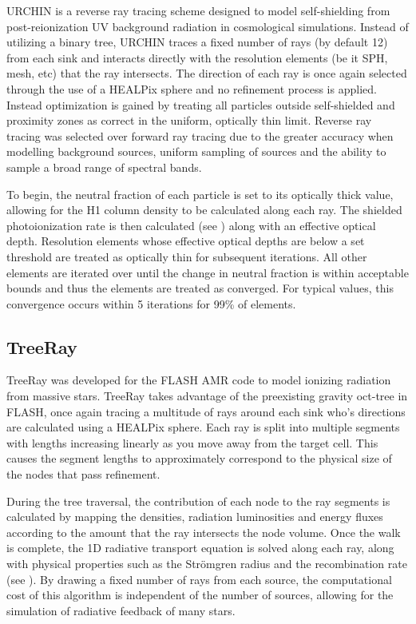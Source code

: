 URCHIN \citep{urchin} is a reverse ray tracing scheme designed to model self-shielding from post-reionization UV background radiation in cosmological simulations. Instead of utilizing a binary tree, URCHIN traces a fixed number of rays (by default 12) from each sink and interacts directly with the resolution elements (be it SPH, mesh, etc) that the ray intersects. The direction of each ray is once again selected through the use of a HEALPix sphere and no refinement process is applied. Instead optimization is gained by treating all particles outside self-shielded and proximity zones as correct in the uniform, optically thin limit. Reverse ray tracing was selected over forward ray tracing due to the greater accuracy when modelling background sources, uniform sampling of sources and the ability to sample a broad range of spectral bands.

To begin, the neutral fraction of each particle is set to its optically thick value, allowing for the H1 column density to be calculated along each ray. The shielded photoionization rate is then calculated (see \citealt{urchin}) along with an effective optical depth. Resolution elements whose effective optical depths are below a set threshold are treated as optically thin for subsequent iterations. All other elements are iterated over until the change in neutral fraction is within acceptable bounds and thus the elements are treated as converged. For typical values, this convergence occurs within 5 iterations for 99\% of elements.

\subsection{TreeRay}

TreeRay \citep{treeRay} was developed for the FLASH AMR code \citep{flash} to model ionizing radiation from massive stars. TreeRay takes advantage of the preexisting gravity oct-tree in FLASH, once again tracing a multitude of rays around each sink who's directions are calculated using a HEALPix sphere. Each ray is split into multiple segments with lengths increasing linearly as you move away from the target cell. This causes the segment lengths to approximately correspond to the physical size of the nodes that pass refinement.

During the tree traversal, the contribution of each node to the ray segments is calculated by mapping the densities, radiation luminosities and energy fluxes according to the amount that the ray intersects the node volume. Once the walk is complete, the 1D radiative transport equation is solved along each ray, along with physical properties such as the Str{\"o}mgren radius and the recombination rate (see \citep{treeRay}). By drawing a fixed number of rays from each source, the computational cost of this algorithm is independent of the number of sources, allowing for the simulation of radiative feedback of many stars.

